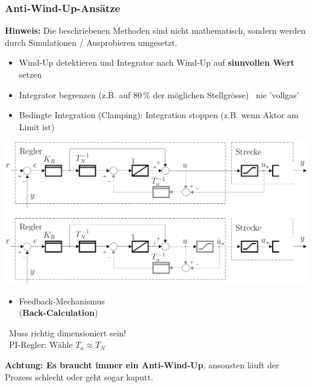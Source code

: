 \subsubsection{Anti-Wind-Up-Ansätze}

\textbf{Hinweis:} Die beschriebenen Methoden sind nicht mathematisch, sondern werden durch Simulationen / Ausprobieren umgesetzt.

\begin{itemize}
    \item Wind-Up detektieren und Integrator nach Wind-Up auf \textbf{sinnvollen Wert} setzen
    \item Integrator begrenzen (z.B. auf $80 \, \%$ der möglichen Stellgrösse) \textrightarrow\ nie 'vollgas'
    \item Bedingte Integration (Clamping): Integration stoppen (z.B. wenn Aktor am Limit ist)
\end{itemize}


\begin{minipage}[c]{0.48\columnwidth}
    \includegraphics[width=\columnwidth]{images/anti-wind-up.png}
\end{minipage}
\hfill
\begin{minipage}[c]{0.48\columnwidth}
    \begin{itemize}
        \item Feedback-Mechanismus\\
            (\textbf{Back-Calculation})
    \end{itemize}
    \vspace{0.2cm}

    \textrightarrow\ Muss richtig dimensioniert sein! \\
    \textrightarrow\ PI-Regler: Wähle $T_a \approx T_N$
\end{minipage}

\textbf{Achtung: Es braucht immer ein Anti-Wind-Up}, ansonsten läuft der Prozess schlecht oder geht sogar kaputt.